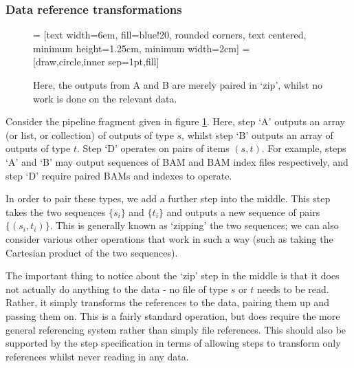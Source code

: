 \documentclass[10pt,a4paper]{article}
\newcommand{\npar}{\par\noindent\space}
\begin{document}
\subsubsection{Data reference transformations}
\begin{figure}
\begin{center}
 = [text width=6em, fill=blue!20, rounded corners, text centered, minimum height=1.25cm, minimum width=2cm]
 = [draw,circle,inner sep=1pt,fill]
\end{center}
\caption{Here, the outputs from A and B are merely paired in `zip', whilst no work is done on the relevant data.}
\label{fig:referenceTransform}
\end{figure}

\npar Consider the pipeline fragment given in figure \ref{fig:referenceTransform}. Here, step `A' outputs an array (or list, or collection) of outputs of type $s$, whilst step `B' outputs an array of outputs of type $t$. Step `D' operates on pairs of items $(s,t)$. For example, steps `A' and `B' may output sequences of BAM and BAM index files respectively, and step `D' require paired BAMs and indexes to operate.
\npar In order to pair these types, we add a further step into the middle. This step takes the two sequences $ \{s_i\} $ and $ \{t_i\} $ and outputs a new sequence of pairs $ \{(s_i, t_i)\} $. This is generally known as `zipping' the two sequences; we can also consider various other operations that work in such a way (such as taking the Cartesian product of the two sequences).
\npar The important thing to notice about the `zip' step in the middle is that it does not actually do anything to the data - no file of type $s$ or $t$ needs to be read. Rather, it simply transforms the references to the data, pairing them up and passing them on. This is a fairly standard operation, but does require the more general referencing system rather than simply file references. This should also be supported by the step specification in terms of allowing steps to transform only references whilst never reading in any data.
\end{document}
